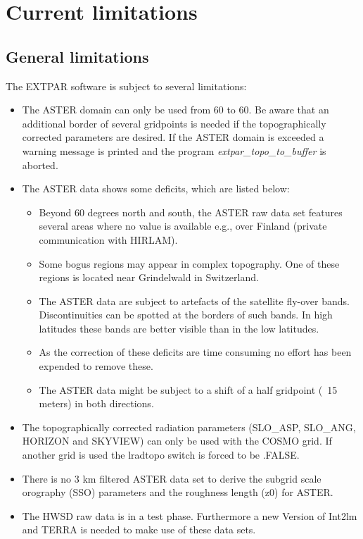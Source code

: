 \documentclass[a4paper,10pt,DIV14,BCOR1cm,titlepage,twoside]{scrartcl}
\begin{document}
\section{Current limitations}
\subsection{General limitations}
The EXTPAR software is subject to several limitations:
\begin{itemize}
 \item The ASTER domain can only be used from 60 to 60. Be aware that an additional border of several gridpoints is needed if the topographically corrected parameters are desired. If the ASTER domain is exceeded a warning message is printed and the program \textit{extpar\_topo\_to\_buffer} is aborted.
\item The ASTER data shows some deficits, which are listed below:
  \begin{itemize}
    \item Beyond 60 degrees north and south, the ASTER raw data set features several areas where no value is available e.g., over Finland (private communication with HIRLAM).
    \item Some bogus regions may appear in complex topography. One of these regions is located near Grindelwald in Switzerland.
    \item The ASTER data are subject to artefacts of the satellite fly-over bands. Discontinuities can be spotted at the borders of such bands. In high latitudes these bands are better visible than in the low latitudes.
    \item As the correction of these deficits are time consuming no effort has been expended to remove these.
    \item The ASTER data might be subject to a shift of a half gridpoint (~15 meters) in both directions.
  \end{itemize}
 \item The topographically corrected radiation parameters (SLO\_ASP, SLO\_ANG, HORIZON and SKYVIEW) can only be used with the COSMO grid. If another grid is used the lradtopo switch is forced to be .FALSE.
 \item There is no 3 km filtered ASTER data set to derive the subgrid scale orography (SSO) parameters and the roughness length (z0) for ASTER. 
\item The HWSD raw data is in a test phase. Furthermore a new Version of Int2lm and TERRA is needed to make use of these data sets.

\end{itemize}
\end{document}
